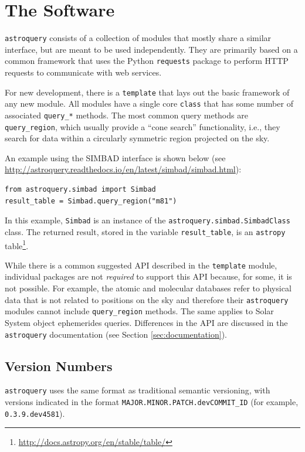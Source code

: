 \documentclass[twocolumn]{aastex62}
\newcommand{\package}[1]{\texttt{#1}\xspace}
\newcommand{\astroquery}{\package{astroquery}}
\newcommand{\astropypkg}{\package{astropy}}
\begin{document}


\section{The Software}
\label{sec:software}
\astroquery consists of a collection of modules that mostly share a similar
interface, but are meant to be used independently.  They are primarily based on
a common framework that uses the Python \package{requests} package to perform
HTTP requests to communicate with web services.

For new development, there is a \texttt{template}  that lays out the basic
framework of any new module.  All modules have a single core
\texttt{class} that has some number of associated \texttt{query\_*} methods.
The most common query methods are \texttt{query\_region}, which usually provide
a ``cone search'' functionality, i.e., they search for data within a circularly
symmetric region projected on the sky.

An example using the SIMBAD interface is shown below (see
\url{http://astroquery.readthedocs.io/en/latest/simbad/simbad.html}):
\begin{lstlisting}[caption=Query SIMBAD for a region around M81]
from astroquery.simbad import Simbad
result_table = Simbad.query_region("m81")
\end{lstlisting}
In this example, \texttt{Simbad} is an instance of the
\texttt{astroquery.simbad.SimbadClass} class.
The returned result, stored in the variable \texttt{result\_table},
is an \astropypkg table\footnote{\url{http://docs.astropy.org/en/stable/table/}}.

While there is a common suggested API described in the \texttt{template} module,
individual packages are not \emph{required} to support this API because, for
some, it is not possible.  For example, the atomic and molecular databases refer
to physical data that is not related to positions on the sky and therefore
their \astroquery modules cannot include \texttt{query\_region} methods. The
same applies to Solar System object ephemerides queries. Differences in the API
are discussed in the \astroquery documentation (see Section
\ref{sec:documentation}).

\subsection{Version Numbers}
\label{sec:versionnumbers}
\astroquery uses the same format as traditional semantic versioning,
with versions indicated in the format \texttt{MAJOR.MINOR.PATCH.devCOMMIT\_ID} (for
example, \texttt{0.3.9.dev4581}).  
\end{document}
